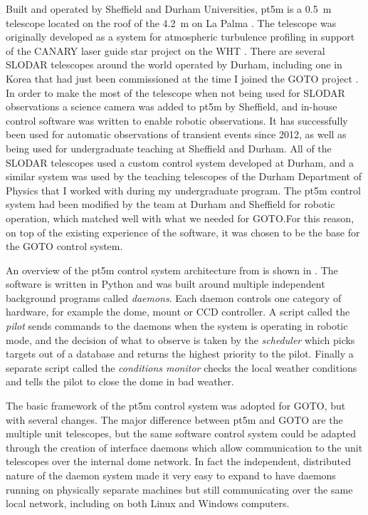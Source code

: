 \begin{colsection}
\begin{colsection}
Built and operated by Sheffield and Durham Universities, pt5m is a \SI{0.5}{\metre} telescope located on the roof of the \SI{4.2}{\metre}  on La Palma \citep{pt5m}. The telescope was originally developed as a  system for atmospheric turbulence profiling in support of the CANARY laser guide star project on the WHT \citep{SLODAR_LaPalma, CANARY}. There are several SLODAR telescopes around the world operated by Durham, including one in Korea that had just been commissioned at the time I joined the GOTO project \citep{SLODAR_Korea}. In order to make the most of the telescope when not being used for SLODAR observations a science camera was added to pt5m by Sheffield, and in-house control software was written to enable robotic observations. It has successfully been used for automatic observations of transient events since 2012, as well as being used for undergraduate teaching at Sheffield and Durham. All of the SLODAR telescopes used a custom control system developed at Durham, and a similar system was used by the teaching telescopes of the Durham Department of Physics that I worked with during my undergraduate program. The pt5m control system had been modified by the team at Durham and Sheffield for robotic operation, which matched well with what we needed for GOTO.\@ For this reason, on top of the existing experience of the software, it was chosen to be the base for the GOTO control system.

An overview of the pt5m control system architecture from \citet{pt5m} is shown in . The software is written in Python and was built around multiple independent background programs called \emph{daemons}. Each daemon controls one category of hardware, for example the dome, mount or CCD controller. A script called the \emph{pilot} sends commands to the daemons when the system is operating in robotic mode, and the decision of what to observe is taken by the \emph{scheduler} which picks targets out of a database and returns the highest priority to the pilot. Finally a separate script called the \emph{conditions monitor} checks the local weather conditions and tells the pilot to close the dome in bad weather.

The basic framework of the pt5m control system was adopted for GOTO, but with several changes. The major difference between pt5m and GOTO are the multiple unit telescopes, but the same software control system could be adapted through the creation of interface daemons which allow communication to the unit telescopes over the internal dome network. In fact the independent, distributed nature of the daemon system made it very easy to expand to have daemons running on physically separate machines but still communicating over the same local network, including on both Linux and Windows computers.


\end{colsection}
\end{colsection}

